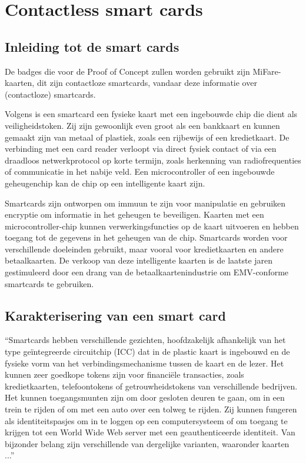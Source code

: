 \section{Contactless smart cards}
\subsection{Inleiding tot de smart cards}
De badges die voor de Proof of Concept zullen worden gebruikt zijn MiFare-kaarten, dit zijn contactloze smartcards, vandaar deze informatie over (contactloze) smartcards.

Volgens \textcite{SwatiTawdeSmartCard} is een smartcard een fysieke kaart met een ingebouwde chip die dient als veiligheidstoken. Zij zijn gewoonlijk even groot als een bankkaart en kunnen gemaakt zijn van metaal of plastiek, zoals een rijbewijs of een kredietkaart. De verbinding met een card reader verloopt via direct fysiek contact of via een draadloos netwerkprotocol op korte termijn, zoals herkenning van radiofrequenties of communicatie in het nabije veld. Een microcontroller of een ingebouwde geheugenchip kan de chip op een intelligente kaart zijn. 

Smartcards zijn ontworpen om immuun te zijn voor manipulatie en gebruiken encryptie om informatie in het geheugen te beveiligen. Kaarten met een microcontroller-chip kunnen verwerkingsfuncties op de kaart uitvoeren en hebben toegang tot de gegevens in het geheugen van de chip. Smartcards worden voor verschillende doeleinden gebruikt, maar vooral voor kredietkaarten en andere betaalkaarten. De verkoop van deze intelligente kaarten is de laatste jaren gestimuleerd door een drang van de betaalkaartenindustrie om EMV-conforme smartcards te gebruiken. 

\subsection{Karakterisering van een smart card}
``Smartcards hebben verschillende gezichten, hoofdzakelijk afhankelijk van het type geïntegreerde circuitchip (ICC) dat in de plastic kaart is ingebouwd en de fysieke vorm van het verbindingsmechanisme tussen de kaart en de lezer. Het kunnen zeer goedkope tokens zijn voor financiële transacties, zoals kredietkaarten, telefoontokens of getrouwheidstokens van verschillende bedrijven. Het kunnen toegangsmunten zijn om door gesloten deuren te gaan, om in een trein te rijden of om met een auto over een tolweg te rijden. Zij kunnen fungeren als identiteitspasjes om in te loggen op een computersysteem of om toegang te krijgen tot een World Wide Web server met een geauthenticeerde identiteit. Van bijzonder belang zijn verschillende van dergelijke varianten, waaronder kaarten ...''\autocite{OreillySmartCards}

